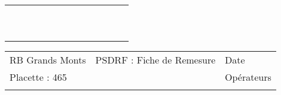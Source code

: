 \documentclass[a4paper, landscape]{article}\usepackage[]{graphicx}\usepackage[]{color}
\begin{document}
{\begin{tabular}{|p{1cm}|p{2cm}|p{1.6cm}|p{1.6cm}|p{1.6cm}|p{1.6cm}|p{1.5cm}|p{1.5cm}|p{1.5cm}|p{1.5cm}|p{1.5cm}|p{7.5cm}|p{5cm}|}
   \rowcolor[gray]{0.95} \hline
 &  &  &  &  &  &  &  &  &  &  &  &  \\ 
   \hline
 &  &  &  &  &  &  &  &  &  &  &  &  \\ 
   \rowcolor[gray]{0.95} \hline
 &  &  &  &  &  &  &  &  &  &  &  &  \\ 
   \hline
 &  &  &  &  &  &  &  &  &  &  &  &  \\ 
   \rowcolor[gray]{0.95} \hline
 &  &  &  &  &  &  &  &  &  &  &  &  \\ 
   \hline
 &  &  &  &  &  &  &  &  &  &  &  &  \\ 
   \rowcolor[gray]{0.95} \hline
 &  &  &  &  &  &  &  &  &  &  &  &  \\ 
   \hline
 &  &  &  &  &  &  &  &  &  &  &  &  \\ 
   \rowcolor[gray]{0.95} \hline
 &  &  &  &  &  &  &  &  &  &  &  &  \\ 
   \hline
 &  &  &  &  &  &  &  &  &  &  &  &  \\ 
   \rowcolor[gray]{0.95} \hline
 &  &  &  &  &  &  &  &  &  &  &  &  \\ 
   \hline
\end{tabular}
}

\begin{tabular}{p{10cm}p{10cm}p{8cm}}
  RB Grands Monts & PSDRF : Fiche de Remesure & Date \\ 
  Placette : 465 &  & Opérateurs \\ 
   &  &  \\ 
  \end{tabular}
\end{document}
